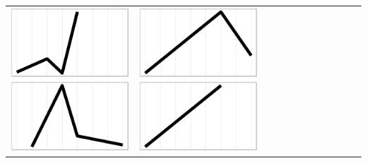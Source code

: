 \documentclass[10pt, conference, compsocconf]{IEEEtran}
\begin{document}
\begin{table}
\begin{tabular}{ | b{1.5cm} | c | c | c | c | c | c | c | c | c | c | c |}
 \includegraphics[scale=0.08]{figures/abca.ps} &  
 \includegraphics[scale=0.08]{figures/babc.ps} &  

\end{tabular}
\end{table}
\end{document}
